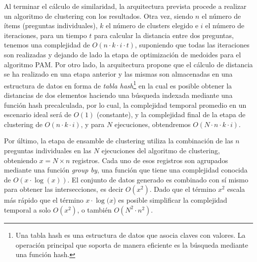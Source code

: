 \bigskip Al terminar el cálculo de similaridad, la arquitectura prevista procede a realizar un algoritmo de clustering con los resultados. Otra vez, siendo \(n\) el número de ítems (preguntas individuales), \(k\) el número de clusters elegido e \(i\) el número de iteraciones, para un tiempo \(t\) para calcular la distancia entre dos preguntas, tenemos una complejidad de \(O(n \cdot k \cdot i \cdot t)\), suponiendo que todas las iteraciones son realizadas y dejando de lado la etapa de optimización de medoides para el algoritmo PAM. Por otro lado, la arquitectura propone que el cálculo de distancia se ha realizado en una etapa anterior y las mismas son almacenadas en una estructura de datos en forma de \textit{tabla hash}\footnote{Una tabla hash es una estructura de datos que asocia claves con valores. La operación principal que soporta de manera eficiente es la búsqueda mediante una función hash.} en la cual es posible obtener la distancias de dos elementos haciendo una búsqueda indexada mediante una función hash precalculada, por lo cual, la complejidad temporal promedio en un escenario ideal será de \(O(1)\) (constante), y la complejidad final de la etapa de clustering de \(O(n \cdot k \cdot i)\), y para \(N\) ejecuciones, obtendremos \(O(N \cdot n \cdot k \cdot i)\).

\bigskip Por último, la etapa de ensamble de clustering utiliza la combinación de las \(n\) preguntas individuales en las \(N\) ejecuciones del algoritmo de clustering, obteniendo \(x = N \times n\) registros. Cada uno de esos registros son agrupados mediante una función \textit{group by}, una función que tiene una complejidad conocida de  \(O(x \cdot \log(x))\). El conjunto de datos generado es combinado con sí mismo para obtener las intersecciones, es decir \(O(x^2)\). Dado que el término \(x^2\) escala más rápido que el término \(x \cdot \log(x\)) es posible simplificar la complejidad temporal a solo \(O(x^2)\), o también \(O(N^2 \cdot n^2)\).

